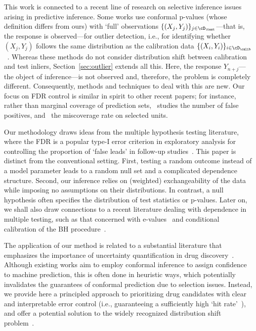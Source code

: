 This work is connected to a recent line of research on
selective inference issues arising in predictive inference.
Some works use
conformal p-values (whose definition differs from ours)
with `full' observations $\{(X_{j},Y_j)\}_{j\in \cD_\test}$---that is, the response is observed---for outlier detection, i.e., for identifying whether $(X_{j},Y_j)$
follows the same distribution as the calibration data
$\{(X_{i},Y_i)\}_{i\in \cD_\calib}$~\cite{bates2021testing,liang2022integrative,marandon2022machine}.
Whereas these methods do not consider distribution shift between
calibration and test inliers,
Section~\ref{sec:outlier} extends all this.
Here, the response $Y_{n+j}$---the object of inference---is not observed and, therefore, the problem is completely different. Consequently, methods and techniques to deal with this are new.
%
Our focus on FDR control is similar in spirit to other recent papers; for instance,
rather than marginal coverage of prediction sets,~\cite{fisch2022conformal}
studies the number of false positives,
and~\cite{bao2023selective} the
miscoverage rate on selected units.

Our methodology draws ideas from the multiple hypothesis testing literature,
where the FDR is
a popular type-I error criterion in exploratory analysis for controlling the
proportion of `false leads' in follow-up studies~\cite{benjamini1995controlling,benjamini2001control}.
This  paper is distinct from the conventional setting.
First, testing a random outcome instead of a model parameter
leads to a random null set and a complicated dependence structure.
Second, our inference relies on (weighted)
exchangeability of the data while imposing no assumptions on their distributions. In contrast,
a null hypothesis often
specifies the distribution of test statistics or p-values. Later on, we shall also draw connections to a recent literature dealing with dependence in multiple testing,
such as that concerned with e-values~\cite{vovk2021values,wang2020false}
and conditional calibration of the BH procedure~\cite{fithian2020conditional}.

The application of our method is related
to a substantial literature that emphasizes
the importance of uncertainty quantification in drug discovery~\cite{Norinder2014,svensson2017improving,Ahlberg2017current,svensson2018conformal,cortes2019concepts,wang2022improving}.
Although existing works aim to employ conformal inference
to assign confidence to machine prediction,
this is often done
in heuristic ways, which
potentially invalidates the guarantees of conformal prediction due to selection issues.
Instead,
we provide here a principled approach to
prioritizing drug candidates
with clear and interpretable error control (i.e., guaranteeing a
sufficiently high `hit rate'~\cite{wang2022improving}),
and offer a potential solution to
the widely recognized distribution shift problem~\cite{Krstajic2021,fannjiang2023novelty}.


